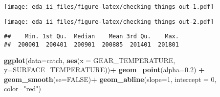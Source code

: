 \documentclass[
]{article}
\newenvironment{Shaded}{\begin{snugshade}}{\end{snugshade}}
\newcommand{\CommentTok}[1]{\textcolor[rgb]{0.56,0.35,0.01}{\textit{#1}}}
\newcommand{\DataTypeTok}[1]{\textcolor[rgb]{0.13,0.29,0.53}{#1}}
\newcommand{\DecValTok}[1]{\textcolor[rgb]{0.00,0.00,0.81}{#1}}
\newcommand{\FloatTok}[1]{\textcolor[rgb]{0.00,0.00,0.81}{#1}}
\newcommand{\KeywordTok}[1]{\textcolor[rgb]{0.13,0.29,0.53}{\textbf{#1}}}
\newcommand{\NormalTok}[1]{#1}
\newcommand{\OperatorTok}[1]{\textcolor[rgb]{0.81,0.36,0.00}{\textbf{#1}}}
\newcommand{\OtherTok}[1]{\textcolor[rgb]{0.56,0.35,0.01}{#1}}
\newcommand{\StringTok}[1]{\textcolor[rgb]{0.31,0.60,0.02}{#1}}
\begin{document}
\begin{Shaded}
\end{Shaded}

\texttt{[image: eda\_ii\_files/figure-latex/checking things out-1.pdf]}

\begin{Shaded}
\end{Shaded}

\texttt{[image: eda\_ii\_files/figure-latex/checking things out-2.pdf]}

\begin{Shaded}
\end{Shaded}

\begin{verbatim}
##    Min. 1st Qu.  Median    Mean 3rd Qu.    Max. 
##  200001  200401  200901  200885  201401  201801
\end{verbatim}

\begin{Shaded}
\begin{Highlighting}[]
\KeywordTok{ggplot}\NormalTok{(}\DataTypeTok{data=}\NormalTok{catch, }\KeywordTok{aes}\NormalTok{(}\DataTypeTok{x =}\NormalTok{ GEAR_TEMPERATURE, }\DataTypeTok{y=}\NormalTok{SURFACE_TEMPERATURE))}\OperatorTok{+}
\StringTok{  }\KeywordTok{geom_point}\NormalTok{(}\DataTypeTok{alpha=}\FloatTok{0.2}\NormalTok{) }\OperatorTok{+}
\StringTok{  }\KeywordTok{geom_smooth}\NormalTok{(}\DataTypeTok{se=}\OtherTok{FALSE}\NormalTok{)}\OperatorTok{+}
\StringTok{  }\KeywordTok{geom_abline}\NormalTok{(}\DataTypeTok{slope=}\DecValTok{1}\NormalTok{, }\DataTypeTok{intercept =} \DecValTok{0}\NormalTok{, }\DataTypeTok{color=}\StringTok{"red"}\NormalTok{)}
\end{Highlighting}
\end{Shaded}
\end{document}
